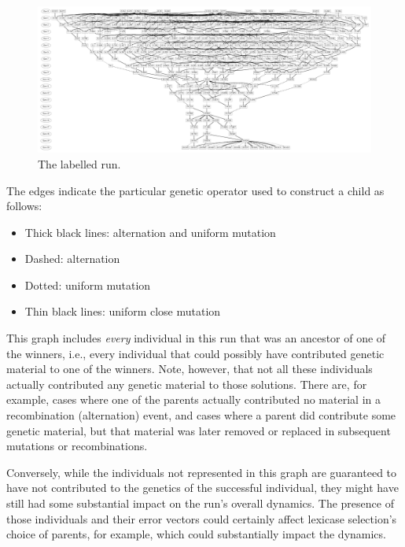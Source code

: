 \begin{figure} %
	\begin{center}
		\vspace{0.6\columnwidth}
		\includegraphics[width=\columnwidth]{../figures/run0_GPTP_2_font_30}
	\end{center}
	\caption{The labelled run.}
	\label{fig:run0Labelled}       %
\end{figure}

The edges indicate the particular genetic operator used to construct a child
as follows:
\begin{itemize}
	\item Thick black lines: alternation and uniform mutation
	\item Dashed: alternation
	\item Dotted: uniform mutation
	\item Thin black lines: uniform close mutation
\end{itemize}

This graph includes \emph{every} individual in this run that was an 
ancestor of one of the winners, i.e., every individual that could possibly have 
contributed genetic material to one of the winners. Note, however, that not
all these individuals actually contributed any genetic material to those
solutions. There are, for example, cases where one of the parents actually
contributed no material in a recombination (alternation) event, and cases where
a parent did contribute some genetic material, but that material was later
removed or replaced in subsequent mutations or recombinations. 

Conversely, while the individuals not represented in this graph are
guaranteed to have not contributed to the genetics of the successful
individual, they might have still had some substantial impact on the
run's overall dynamics. The presence of those individuals and their
error vectors could certainly affect lexicase selection's choice of parents,
for example, which could substantially impact the dynamics.

